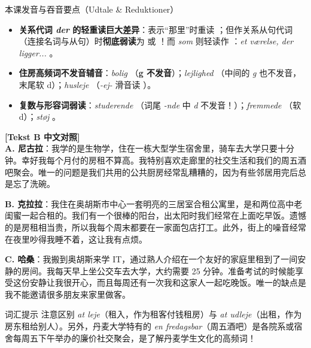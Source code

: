 \begin{tipbox}{本课发音与吞音要点（Udtale \& Reduktioner）}
\begin{itemize}
  \item \textbf{关系代词 \textit{der} 的轻重读巨大差异}：表示“那里”时重读 ；但作关系从句代词（连接名词与从句）时\textbf{彻底弱读}为  或 ！而 \textit{som} 则轻读作 ：\textit{et værelse, der ligger...} 。
  \item \textbf{住房高频词不发音辅音}：\textit{bolig} （\textbf{g 不发音}）；\textit{lejlighed} （中间的 \textit{g} 也不发音，末尾软 d）；\textit{husleje} （\textit{-ej-} 滑音读 ）。
  \item \textbf{复数与形容词弱读}：\textit{studerende} （词尾 \textit{-nde} 中 \textit{d} 不发音！）；\textit{fremmede} （软 d）；\textit{støj} 。
\end{itemize}
\end{tipbox}

\begin{transbox}
\small
\textbf{\color{NCDTeal}[Tekst B 中文对照]}\\
\textbf{A. 尼古拉}：我学的是生物学，住在一栋大型学生宿舍里，骑车去大学只要十分钟。幸好我每个月付的房租不算高。我特别喜欢走廊里的社交生活和我们的周五酒吧聚会。唯一的问题是我们共用的公共厨房经常乱糟糟的，因为有些邻居用完后总是忘了洗碗。

\textbf{B. 克拉拉}：我住在奥胡斯市中心一套明亮的三居室合租公寓里，是和两位高中老闺蜜一起合租的。我们有一个很棒的阳台，出太阳时我们经常在上面吃早饭。遗憾的是房租相当贵，所以我每个周末都要在一家面包店打工。此外，街上的噪音经常在夜里吵得我睡不着，这让我有点烦。

\textbf{C. 哈桑}：我搬到奥胡斯来学 IT，通过熟人介绍在一个友好的家庭里租到了一间安静的房间。我每天早上坐公交车去大学，大约需要 25 分钟。准备考试的时候能享受这份安静让我很开心，而且每周还有一次我和这家人一起吃晚饭。唯一的缺点是我不能邀请很多朋友来家里做客。
\end{transbox}


\begin{tipbox}{词汇提示}
注意区别 \textit{at leje}（租入，作为租客付钱租房）与 \textit{at udleje}（出租，作为房东租给别人）。另外，丹麦大学特有的 \textit{en fredagsbar}（周五酒吧）是各院系或宿舍每周五下午举办的廉价社交聚会，是了解丹麦学生文化的高频词！
\end{tipbox}

